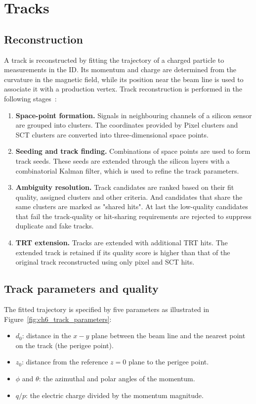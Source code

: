 \section{Tracks}
\label{sec:ch6_tracks}

\subsection{Reconstruction}

A track is reconstructed by fitting the trajectory of a charged particle to measurements in the ID.
Its momentum and charge are determined from the curvature in the magnetic field, while its position near the beam line is used to associate it with a production vertex.
Track reconstruction is performed in the following stages~\cite{ATLAS2017DenseTracking}:
\begin{enumerate}
    \item \textbf{Space-point formation.} Signals in neighbouring channels of a silicon sensor are grouped into clusters. The coordinates provided by Pixel clusters and SCT clusters are converted into three-dimensional space points.
    \item \textbf{Seeding and track finding.} Combinations of space points are used to form track seeds. These seeds are extended through the silicon layers with a combinatorial Kalman filter, which is used to refine the track parameters.
    \item \textbf{Ambiguity resolution.} Track candidates are ranked based on their fit quality, assigned clusters and other criteria. And candidates that share the same clusters are marked as "shared hits". At last the low-quality candidates that fail the track-quality or hit-sharing requirements are rejected to suppress duplicate and fake tracks.
    \item \textbf{TRT extension.} Tracks are extended with additional TRT hits. The extended track is retained if its quality score is higher than that of the original track reconstructed using only pixel and SCT hits.
\end{enumerate}

\subsection{Track parameters and quality}

The fitted trajectory is specified by five parameters as illustrated in Figure~\ref{fig:ch6_track_parameters}:
\begin{itemize}
    \item $d_0$: distance in the $x-y$ plane between the beam line and the nearest point on the track (the perigee point).
    \item $z_0$: distance from the reference $z=0$ plane to the perigee point.
    \item $\phi$ and $\theta$: the azimuthal and polar angles of the momentum.
    \item $q/p$: the electric charge divided by the momentum magnitude.
\end{itemize}

